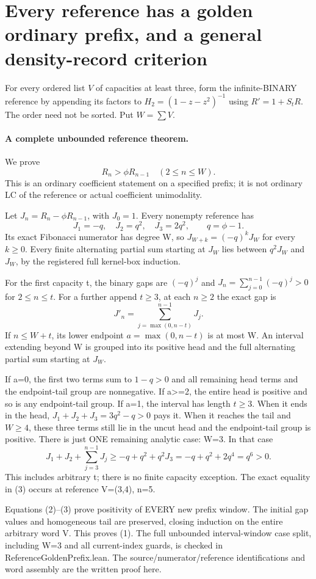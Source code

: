 \section{Every reference has a golden ordinary prefix, and a general density-record criterion}
For every ordered list $V$ of capacities at least three, form the
infinite-BINARY reference by appending its factors to
$H_2=(1-z-z^2)^{-1}$ using $R'=1+S_tR$.
The order need not be sorted. Put $W=\sum V$.

\paragraph{A complete unbounded reference theorem.}
We prove
\[
                     R_n>\phi R_{n-1}\quad(2\le n\le W). \tag{1}
\]
This is an ordinary coefficient statement on a specified prefix;
it is not ordinary LC of the reference or actual coefficient unimodality.

Let $J_n=R_n-\phi R_{n-1}$, with $J_0=1$.
Every nonempty reference has
\[
 J_1=-q,\quad J_2=q^2,\quad J_3=2q^2,\qquad q=\phi-1.
\]
Its exact Fibonacci numerator has degree W, so
$J_{W+k}=(-q)^kJ_W$ for every $k\ge0$.
Every finite alternating partial sum starting at $J_W$ lies between
$q^2J_W$ and $J_W$, by the registered full kernel-box induction.

For the first capacity t, the binary gaps are $(-q)^j$ and
$J_n=\sum_{j=0}^{n-1}(-q)^j>0$ for $2\le n\le t$.
For a further append $t\ge3$, at each $n\ge2$ the exact gap is
\[
                  J'_n=\sum_{j=\max(0,n-t)}^{n-1}J_j.     \tag{2}
\]
If $n\le W+t$, its lower endpoint $a=\max(0,n-t)$ is at most W.
An interval extending beyond W is grouped into its positive head
and the full alternating partial sum starting at $J_W$.

If a=0, the first two terms sum to $1-q>0$ and all remaining head
terms and the endpoint-tail group are nonnegative.
If a>=2, the entire head is positive and so is any endpoint-tail group.
If a=1, the interval has length $t\ge3$.
When it ends in the head, $J_1+J_2+J_3=3q^2-q>0$ pays it.
When it reaches the tail and $W\ge4$, these three terms still lie
in the uncut head and the endpoint-tail group is positive.
There is just ONE remaining analytic case: W=3. In that case
\[
 J_1+J_2+\sum_{j=3}^{n-1}J_j
       \ge -q+q^2+q^2J_3
       =-q+q^2+2q^4=q^6>0.                           \tag{3}
\]
This includes arbitrary t; there is no finite capacity exception.
The exact equality in (3) occurs at reference V=(3,4), n=5.

Equations (2)--(3) prove positivity of EVERY new prefix window.
The initial gap values and homogeneous tail are preserved, closing
induction on the entire arbitrary word V. This proves (1).
The full unbounded interval-window case split, including W=3 and
all current-index guards, is checked in ReferenceGoldenPrefix.lean.
The source/numerator/reference identifications and word assembly
are the written proof here.

